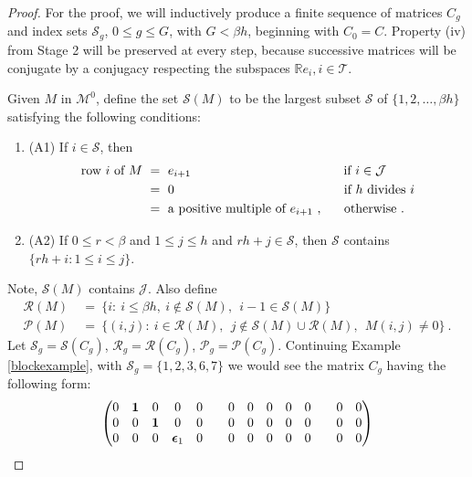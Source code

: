\documentclass{amsart}
\theoremstyle{definition}
\theoremstyle{remark}
\numberwithin{equation}{section}
\begin{document}
{{\begin{proof}
For the proof, we will inductively  produce a finite sequence of matrices 
$C_g$ and index sets $\mathcal S_g$,  
$0\leq g \leq G$, 
with $G <  \beta h$,    
beginning with $C_0=C$. 
Property (iv) from Stage 2 will 
be preserved at every step, because 
successive matrices 
will be  conjugate  by a conjugacy respecting the subspaces 
$\mathbb Re_i, i\in \mathcal T$. 

Given $M$ in $\mathcal M^{0}$, define 
the set $\mathcal S(M)$ to be the largest subset 
$\mathcal S$ 
of  $\{1,2,\dots , \beta h\}$ satisfying the following conditions: 
\begin{enumerate} 
\item[] (A1) 
If $i\in \mathcal S$, then 
\begin{align*} 
\textnormal{row } i \textnormal{ of } 
M  \ &= \ e_{i+1} \qquad \qquad   \qquad \qquad \qquad  \ \
 \quad \textnormal{ if } i\in \mathcal J \\ 
&=\ 0 \qquad \qquad \qquad \qquad \qquad  \quad  \quad 
\quad \textnormal{ if } h \textnormal{ divides } i \\ 
&= \ \textnormal{a positive multiple of } e_{i+1} \ , \quad \  
 \textnormal{ otherwise .} 
\end{align*}
\item[] (A2)  
If $0\leq r < \beta$ and $1 \leq j\leq h$ and 
$rh+ j\in \mathcal S$, \newline 
then 
$\mathcal S$ contains 
 $\{rh+ i: 1\leq i \leq j\}$. 
\end{enumerate} 
Note, $\mathcal S(M)$ contains $\mathcal J$. 
Also define 
\begin{align*} 
\mathcal R(M)\ &=\ \{ i: \ i\leq \beta h, \  i\notin \mathcal S (M),\ \  
i-1\in \mathcal S(M) \} \\ 
\mathcal P(M) \ &=\  \{(i,j): \ i\in \mathcal R(M) ,\  \  
j\notin \mathcal S(M)
\cup \mathcal R(M), \ \  M(i,j) \neq 0\}\ . 
\end{align*}   
Let $\mathcal S_g=\mathcal S(C_g)$, 
$\mathcal R_g=\mathcal R(C_g)$, 
$\mathcal P_g=\mathcal P(C_g)$. 
Continuing Example \ref{blockexample}, 
with $\mathcal S_{g}=\{1,2,3,6,7\}$ we would see 
the matrix   
$C_{g}$ having the following form: 
\begin{align*}
\setcounter{MaxMatrixCols}{14} 
\begin{pmatrix} 
0&\mathbf 1 &0&0&0&& 0&0&0&0&0&& 0&0 \\
0&0&\mathbf 1 &0&0&& 0&0&0&0&0&& 0&0 \\ 
0&0&0&\boldsymbol\epsilon_1   &0&& 0&0&0&0&0&& 0&0 \\ 

\end{pmatrix}
\end{align*}
\end{proof}}}
\end{document}
